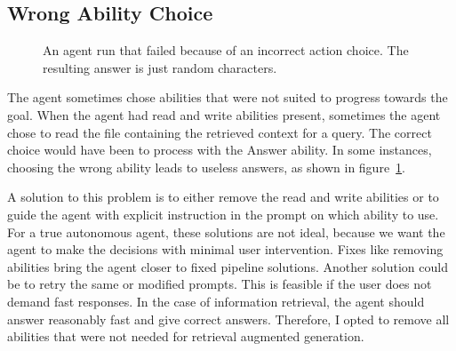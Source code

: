 \documentclass[../main.tex]{subfiles}
\begin{document}
\subsection{Wrong Ability Choice}

\begin{figure}[t]
    \centering
    \caption{An agent run that failed because of an incorrect action choice.
        The resulting answer is just random characters.}
    \label{fig:bad_agent_run}
\end{figure}

The agent sometimes chose abilities that were not suited to progress towards the goal.
When the agent had read and write abilities present, sometimes the agent chose to
read the file containing the retrieved context for a query.
The correct choice would have been to process with the Answer ability.
In some instances, choosing the wrong ability leads to useless answers,
as shown in figure~\ref{fig:bad_agent_run}.

A solution to this problem is to either remove the read and write abilities
or to guide the agent with explicit instruction in the prompt on which ability to use.
For a true autonomous agent, these solutions are not ideal, because we want the
agent to make the decisions with minimal user intervention.
Fixes like removing abilities bring the agent closer to fixed pipeline solutions.
Another solution could be to retry the same or modified prompts.
This is feasible if the user does not demand fast responses.
In the case of information retrieval, the agent should answer reasonably fast and
give correct answers.
Therefore, I opted to remove all abilities that were not needed for retrieval augmented generation.
\end{document}
